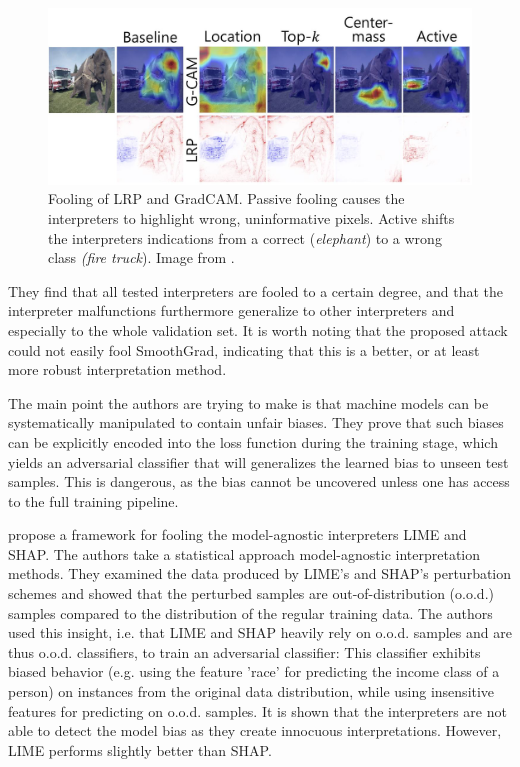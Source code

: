 \begin{figure}[ht]
    \centering
    \includegraphics[width=\linewidth]{figures/heo_intro.jpg}
    \caption{Fooling of LRP and GradCAM. Passive fooling causes the interpreters to highlight wrong, uninformative pixels. Active shifts the interpreters indications from a correct (\textit{elephant}) to a wrong class \textit{(fire truck}). Image from \cite{fooling_nn_interpreters}.}
    \label{fig:heo_intro}
    \vspace{-0.3cm}
\end{figure}

 They find that all tested interpreters are fooled to a certain degree, and that the interpreter malfunctions furthermore generalize to other interpreters and especially to the whole validation set. It is worth noting that the proposed attack could not easily fool SmoothGrad, indicating that this is a better, or at least more robust interpretation method. 

The main point the authors are trying to make is that machine models can be systematically manipulated to contain unfair biases. They prove that such biases can be explicitly encoded into the loss function during the training stage, which yields an adversarial classifier that will generalizes the learned bias to unseen test samples. This is dangerous, as the bias cannot be uncovered unless one has access to the full training pipeline. 

\cite{advlime_aies20} propose a framework for fooling the model-agnostic interpreters LIME and SHAP. 
The authors take a statistical approach model-agnostic interpretation methods. They examined the data produced by LIME's and SHAP's perturbation schemes and showed that the perturbed samples are out-of-distribution (o.o.d.) samples compared to the distribution of the regular training data. The authors used this insight, i.e. that LIME and SHAP heavily rely on o.o.d. samples and are thus o.o.d. classifiers, to train an adversarial classifier: This classifier exhibits biased behavior (e.g. using the feature 'race' for predicting the income class of a person) on instances from the original data distribution, while using insensitive features for predicting on o.o.d. samples. It is shown that the interpreters are not able to detect the model bias as they create innocuous interpretations. However, LIME performs slightly better than SHAP. 

